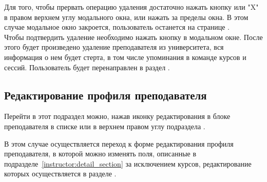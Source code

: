Для того, чтобы прервать операцию удаления достаточно нажать кнопку  или "X" в правом верхнем углу модального окна, или нажать за пределы окна. В этом случае модальное окно закроется, пользователь останется на странице .\\

Чтобы подтвердить удаление необходимо нажать кнопку  в модальном окне. После этого будет произведено удаление преподавателя из университета, вся информация о нем будет стерта, в том числе упоминания в команде курсов и сессий. Пользователь будет перенаправлен в раздел .
	
\subsection{Редактирование профиля преподавателя}\label{instructor:edit_section}
Перейти в этот подраздел можно, нажав иконку редактирования  в блоке преподавателя в списке или в верхнем правом углу подраздела .


В этом случае осуществляется переход к форме редактирования профиля преподавателя, в которой можно изменять поля, описанные в подразделе~\ref{instructor:detail_section} за исключением курсов, редактирование которых осуществляется в разделе . 

